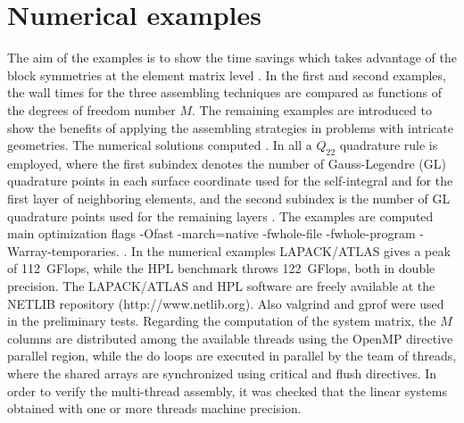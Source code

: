 \documentclass[oneside,onecolumn,10pt,final]{asme2ej}
\begin{document}
\section{Numerical examples}
\label{sec:numerical-examples}

\noindent
The aim of the examples is to show the time savings
which takes advantage of the block symmetries at the
element matrix level .
%
%
In the first and second examples, the wall times for the
three assembling techniques are compared as functions  
of the degrees of freedom number $M$.
%
The remaining examples are introduced to show the benefits
of applying the assembling strategies in problems with
intricate geometries.
%
The numerical solutions computed  \cite{rf:jdelia-gbem2}.
%
%
%
In all  a $Q_{22}$ quadrature rule is employed,
where the first subindex denotes the number of Gauss-Legendre (GL)
quadrature points in each surface coordinate used for the
self-integral and for the first layer of neighboring elements,
and the second subindex is the number of GL quadrature points
used for the remaining layers \cite{rf:jdelia-gbem2}. 
%
%
The examples are computed  main optimization 
flags {\rm -Ofast -march=native -fwhole-file -fwhole-program 
-Warray-temporaries}.  
%
.
%
In the numerical examples LAPACK/ATLAS gives a peak of 
112~GFlops, while the HPL benchmark throws 122~GFlops, 
both in double precision.
%
The LAPACK/ATLAS and HPL software are freely available
at the NETLIB repository (http://www.netlib.org).
%
Also {\rm valgrind} and {\rm gprof} were used in the 
preliminary tests. 
%
Regarding the computation of the system matrix, the $M$ columns
are distributed among the available threads using the OpenMP
directive parallel region, while the {\rm do} loops are executed 
in parallel by the team of threads, where the shared arrays are
synchronized using {\rm critical} and {\rm flush} directives.
%
In order to verify the multi-thread assembly, it was checked
that the linear systems obtained with one or more threads
 machine precision.
\end{document}
